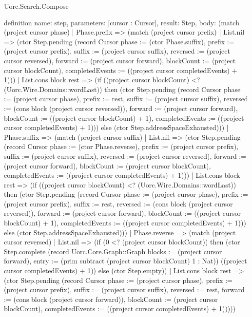 \begin{lexlean}{Uorc.Search.Compose}
\begin{semanticmodule}
definition{
  name: step,
  parameters: [cursor : Cursor],
  result: Step,
  body: (match (project cursor phase)
    | Phase.prefix => (match (project cursor prefix)
      | List.nil => (ctor Step.pending (record Cursor {phase := (ctor Phase.suffix), prefix := (project cursor prefix), suffix := (project cursor suffix), reversed := (project cursor reversed), forward := (project cursor forward), blockCount := (project cursor blockCount), completedEvents := ((project cursor completedEvents) + 1)}))
      | List.cons block rest => (if ((project cursor blockCount) <? (Uorc.Wire.Domains::wordLast)) then (ctor Step.pending (record Cursor {phase := (project cursor phase), prefix := rest, suffix := (project cursor suffix), reversed := (cons block (project cursor reversed)), forward := (project cursor forward), blockCount := ((project cursor blockCount) + 1), completedEvents := ((project cursor completedEvents) + 1)})) else (ctor Step.addressSpaceExhausted)))
    | Phase.suffix => (match (project cursor suffix)
      | List.nil => (ctor Step.pending (record Cursor {phase := (ctor Phase.reverse), prefix := (project cursor prefix), suffix := (project cursor suffix), reversed := (project cursor reversed), forward := (project cursor forward), blockCount := (project cursor blockCount), completedEvents := ((project cursor completedEvents) + 1)}))
      | List.cons block rest => (if ((project cursor blockCount) <? (Uorc.Wire.Domains::wordLast)) then (ctor Step.pending (record Cursor {phase := (project cursor phase), prefix := (project cursor prefix), suffix := rest, reversed := (cons block (project cursor reversed)), forward := (project cursor forward), blockCount := ((project cursor blockCount) + 1), completedEvents := ((project cursor completedEvents) + 1)})) else (ctor Step.addressSpaceExhausted)))
    | Phase.reverse => (match (project cursor reversed)
      | List.nil => (if (0 <? (project cursor blockCount)) then (ctor Step.complete (record Uorc.Core.Graph::Graph {blocks := (project cursor forward), entry := (prim subtract (project cursor blockCount) 1 : Nat)}) ((project cursor completedEvents) + 1)) else (ctor Step.empty))
      | List.cons block rest => (ctor Step.pending (record Cursor {phase := (project cursor phase), prefix := (project cursor prefix), suffix := (project cursor suffix), reversed := rest, forward := (cons block (project cursor forward)), blockCount := (project cursor blockCount), completedEvents := ((project cursor completedEvents) + 1)}))))
}
\end{semanticmodule}
\end{lexlean}
